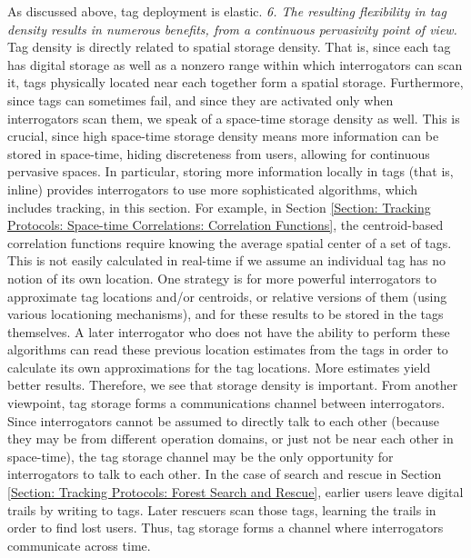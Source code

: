 As discussed above, tag deployment is elastic. \emph{6. The resulting flexibility in tag density results in numerous benefits, from a continuous pervasivity point of view.} Tag density is directly related to spatial storage density. That is, since each tag has digital storage as well as a nonzero range within which interrogators can scan it, tags physically located near each together form a spatial storage. Furthermore, since tags can sometimes fail, and since they are activated only when interrogators scan them, we speak of a space-time storage density as well. This is crucial, since high space-time storage density means more information can be stored in space-time, hiding discreteness from users, allowing for continuous pervasive spaces. In particular, storing more information locally in tags (that is, inline) provides interrogators to use more sophisticated algorithms, which includes tracking, in this section. For example, in Section \ref{Section: Tracking Protocols: Space-time Correlations: Correlation Functions}, the centroid-based correlation functions require knowing the average spatial center of a set of tags. This is not easily calculated in real-time if we assume an individual tag has no notion of its own location. One strategy is for more powerful interrogators to approximate tag locations and/or centroids, or relative versions of them (using various locationing mechanisms), and for these results to be stored in the tags themselves. A later interrogator who does not have the ability to perform these algorithms can read these previous location estimates from the tags in order to calculate its own approximations for the tag locations. More estimates yield better results. Therefore, we see that storage density is important. From another viewpoint, tag storage forms a communications channel between interrogators. Since interrogators cannot be assumed to directly talk to each other (because they may be from different operation domains, or just not be near each other in space-time), the tag storage channel may be the only opportunity for interrogators to talk to each other. In the case of search and rescue in Section \ref{Section: Tracking Protocols: Forest Search and Rescue}, earlier users leave digital trails by writing to tags. Later rescuers scan those tags, learning the trails in order to find lost users. Thus, tag storage forms a channel where interrogators communicate across time.

